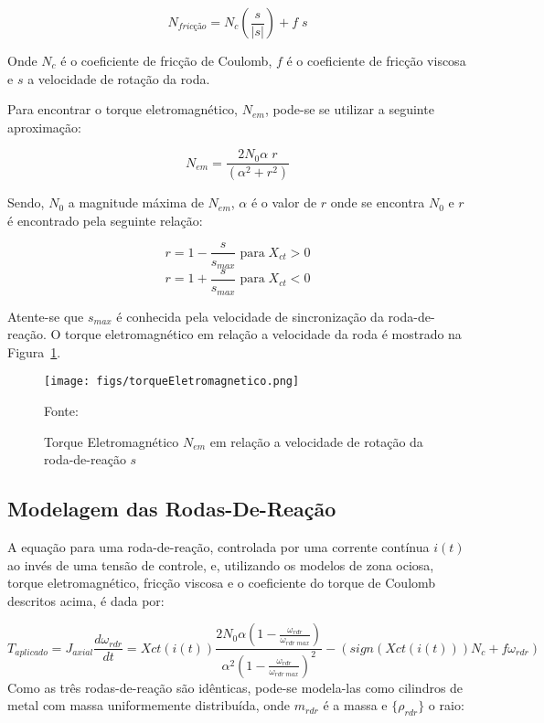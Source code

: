 \begin{equation}N_{fricção}=N_c\left (\frac{s}{|s|}\right )+f\;s\end{equation}

Onde $N_c$ é o coeficiente de fricção de Coulomb, $f$ é o coeficiente de fricção viscosa e $s$ a velocidade de rotação da roda.

Para encontrar o torque eletromagnético, $N_{em}$, pode-se se utilizar a seguinte aproximação:

\begin{equation} N_{em} = \frac{2N_0\alpha\;r}{(\alpha^2+r^2)}\end{equation}

Sendo, $N_0$ a magnitude máxima de $N_{em}$, $\alpha$ é o valor de $r$ onde se encontra $N_0$ e $r$ é encontrado pela seguinte relação:

\begin{equation}r=1-\frac{s}{s_{max}}\;\text{para}\;X_{ct}>0 \end{equation}\begin{equation} r=1+\frac{s}{s_{max}}\;\text{para}\;X_{ct}<0\end{equation}

Atente-se que $s_{max}$ é conhecida pela velocidade de sincronização da roda-de-reação. O torque eletromagnético em relação a velocidade da roda é mostrado na Figura~\ref{fig:15}.

\begin{figure}[htpb]
\centering
\texttt{[image: figs/torqueEletromagnetico.png]}
\caption{Torque Eletromagnético $N_{em}$ em relação a velocidade de rotação da roda-de-reação $s$}
{Fonte: \cite[p.~271]{wertz2012spacecraft}}
\label{fig:15}
\end{figure}

\subsection{Modelagem das Rodas-De-Reação}\label{sec:3.1.6.2}

A equação para uma roda-de-reação, controlada por uma corrente contínua $i(t)$ ao invés de uma tensão de controle, e, utilizando os modelos de zona ociosa,  torque eletromagnético, fricção viscosa e o coeficiente do torque de Coulomb descritos acima, é dada por:

\begin{equation}
T_{aplicado}=J_{axial}\frac{d\omega_{rdr}}{dt}=Xct(i(t))\frac{2N_0\alpha\left (1-\frac{\omega_{rdr}}{\omega_{rdr\;max}} \right )}{\alpha^2\left (1-\frac{\omega_{rdr}}{\omega_{rdr\;max}} \right )^2}-\left (sign(Xct(i(t)))N_c+f\omega_{rdr}\right )
\end{equation}
Como as três rodas-de-reação são idênticas, pode-se modela-las como cilindros de metal com massa uniformemente distribuída, onde $m_{rdr}$ é a massa e $\{\rho_{rdr}\}$ o raio:

